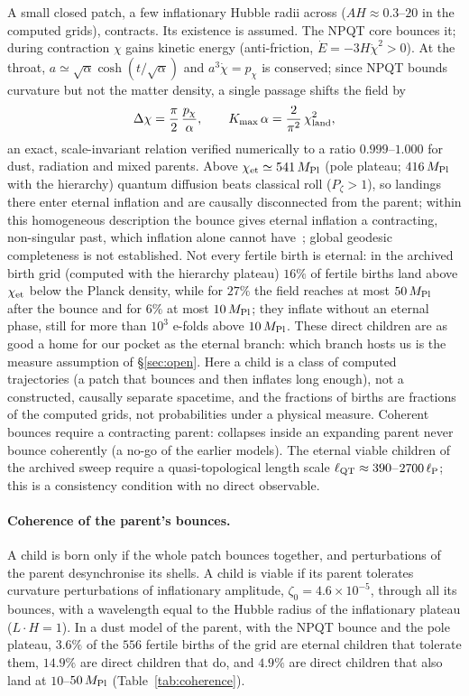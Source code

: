 \documentclass[11pt,a4paper]{article}
\newcommand{\Mpl}{M_{\rm Pl}}
\begin{document}
A small closed patch, a few inflationary Hubble radii across ($AH\approx0.3$--$20$ in the computed grids), contracts.
Its existence is assumed.
The NPQT core bounces it; during contraction $\chi$ gains kinetic energy (anti-friction, $\dot E = -3H\dot\chi^2 > 0$).
At the throat, $a\simeq\sqrt{\alpha}\cosh(t/\sqrt{\alpha})$ and $a^3\dot\chi = p_\chi$ is conserved; since NPQT bounds curvature but not the matter density, a single passage shifts the field by
\begin{equation}
\Delta\chi = \frac{\pi}{2}\,\frac{p_\chi}{\alpha},\qquad K_{\max}\,\alpha = \frac{2}{\pi^2}\,\chi_{\rm land}^2,
\label{eq:kick}
\end{equation}
an exact, scale-invariant relation verified numerically to a ratio $0.999$--$1.000$ for dust, radiation and mixed parents.
Above $\chi_{\rm et}\simeq 541\,\Mpl$ (pole plateau; $416\,\Mpl$ with the hierarchy) quantum diffusion beats classical roll ($P_\zeta>1$), so landings there enter eternal inflation and are causally disconnected from the parent; within this homogeneous description the bounce gives eternal inflation a contracting, non-singular past, which inflation alone cannot have~\cite{BGV2003}; global geodesic completeness is not established.
Not every fertile birth is eternal: in the archived birth grid (computed with the hierarchy plateau) $16\%$ of fertile births land above $\chi_{\rm et}$ below the Planck density, while for $27\%$ the field reaches at most $50\,\Mpl$ after the bounce and for $6\%$ at most $10\,\Mpl$; they inflate without an eternal phase, still for more than $10^3$ e-folds above $10\,\Mpl$. These direct children are as good a home for our pocket as the eternal branch: which branch hosts us is the measure assumption of \S\ref{sec:open}.
Here a child is a class of computed trajectories (a patch that bounces and then inflates long enough), not a constructed, causally separate spacetime, and the fractions of births are fractions of the computed grids, not probabilities under a physical measure.
Coherent bounces require a contracting parent: collapses inside an expanding parent never bounce coherently (a no-go of the earlier models).
The eternal viable children of the archived sweep require a quasi-topological length scale $\ell_{\rm QT}\approx 390$--$2700\,\ell_{\rm P}$; this is a consistency condition with no direct observable.

\paragraph{Coherence of the parent's bounces.}
A child is born only if the whole patch bounces together, and perturbations of the parent desynchronise its shells.
A child is viable if its parent tolerates curvature perturbations of inflationary amplitude, $\zeta_0=4.6\times10^{-5}$, through all its bounces, with a wavelength equal to the Hubble radius of the inflationary plateau ($L\cdot H=1$).
In a dust model of the parent, with the NPQT bounce and the pole plateau, $3.6\%$ of the $556$ fertile births of the grid are eternal children that tolerate them, $14.9\%$ are direct children that do, and $4.9\%$ are direct children that also land at $10$--$50\,\Mpl$ (Table~\ref{tab:coherence}).
\end{document}
